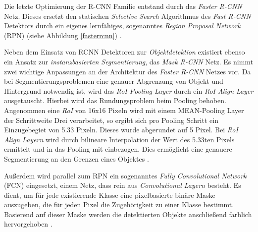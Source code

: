 Die letzte Optimierung der R-CNN Familie entstand durch das \textit{Faster R-CNN} Netz. Dieses ersetzt den statischen \textit{Selective Search} Algorithmus des \textit{Fast R-CNN} Detektors durch ein eigenes lernfähiges, sogenanntes \textit{Region Proposal Network} (RPN)  (siehe Abbildung \ref{fasterrcnn}) \cite{RohithGandhi.20180709}.

Neben dem Einsatz von RCNN Detektoren zur \textit{Objektdetektion} existiert ebenso ein Ansatz zur \textit{instanzbasierten Segmentierung}, das \textit{Mask R-CNN} Netz. Es nimmt zwei wichtige Anpassungen an der Architektur des \textit{Faster R-CNN} Netzes vor. Da bei Segmentierungsproblemen eine genauer Abgrenzung von Objekt und Hintergrund notwendig ist, wird das \textit{RoI Pooling Layer} durch ein \textit{RoI Align Layer} ausgetauscht. Hierbei wird das Rundungsproblem beim Pooling behoben. Angenommen eine \textit{RoI} von 16x16 Pixeln wird mit einem MEAN-Pooling Layer der Schrittweite Drei verarbeitet, so ergibt sich pro Pooling Schritt ein Einzugebegiet von 5.33 Pixeln. Dieses wurde abgerundet auf 5 Pixel. Bei \textit{RoI Align Layern} wird durch bilineare Interpolation der Wert des 5.33ten Pixels ermittelt und in das Pooling mit einbezogen. Dies ermöglicht eine genauere Segmentierung an den Grenzen eines Objektes \cite{UmerFarooq.20180215}.

Außerdem wird parallel zum RPN ein sogenanntes \textit{Fully Convolutional Network} (FCN) eingesetzt, einem Netz, dass rein aus \textit{Convolutional Layern} besteht. Es dient, um für jede existierende Klasse eine pixelbasierte binäre Maske auszugeben, die für jeden Pixel die Zugehörigkeit zu einer Klasse bestimmt. Basierend auf dieser Maske werden die detektierten Objekte anschließend farblich hervorgehoben \cite{DhruvParthasarathy.20170422}.